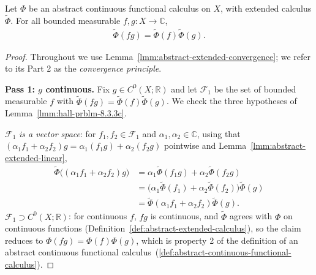 \begin{proposition}
    \label{prpstn:abstract-extended-multiplicative}
    \leanok
    Let $\Phi$ be an abstract continuous functional calculus on $X$, with extended calculus $\widetilde\Phi$. For all bounded measurable $f,g : X \to \mathbb{C}$,
    \begin{align}
        \widetilde\Phi(fg) = \widetilde\Phi(f)\widetilde\Phi(g).
    \end{align}
\end{proposition}
\begin{proof}
    \leanok
Throughout we use Lemma~\ref{lmm:abstract-extended-convergence}; we refer to its Part 2 as the \textit{convergence principle}.

\textbf{Pass 1: $g$ continuous.} Fix $g \in C^0(X;\mathbb{R})$ and let $\mathcal{F}_1$ be the set of bounded measurable $f$ with $\widetilde\Phi(fg) = \widetilde\Phi(f)\widetilde\Phi(g)$. We check the three hypotheses of Lemma~\ref{lmm:hall-prblm-8.3.3c}.

$\mathcal{F}_1$ \textit{is a vector space}: for $f_1,f_2 \in \mathcal{F}_1$ and $\alpha_1,\alpha_2 \in \mathbb{C}$, using that $(\alpha_1f_1+\alpha_2f_2)g = \alpha_1(f_1g)+\alpha_2(f_2g)$ pointwise and Lemma~\ref{lmm:abstract-extended-linear},
\begin{align}
    \widetilde\Phi\big((\alpha_1f_1+\alpha_2f_2)g\big) &= \alpha_1\widetilde\Phi(f_1g)+\alpha_2\widetilde\Phi(f_2g) \\
                &= \big(\alpha_1\widetilde\Phi(f_1)+\alpha_2\widetilde\Phi(f_2)\big)\widetilde\Phi(g) \\
                &= \widetilde\Phi(\alpha_1f_1+\alpha_2f_2)\widetilde\Phi(g).
\end{align}
$\mathcal{F}_1 \supset C^0(X;\mathbb{R})$: for continuous $f$, $fg$ is continuous, and $\widetilde\Phi$ agrees with $\Phi$ on continuous functions (Definition~\ref{def:abstract-extended-calculus}), so the claim reduces to $\Phi(fg) = \Phi(f)\Phi(g)$, which is property 2 of the definition of an abstract continuous functional calculus~(\ref{def:abstract-continuous-functional-calculus}).


\end{proof}
